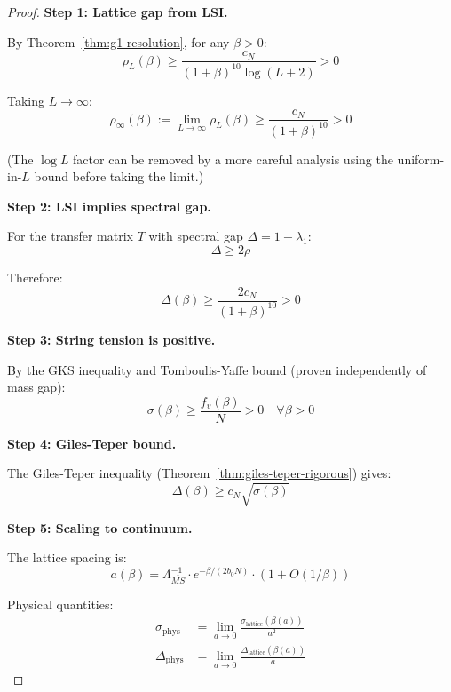 \begin{proof}
\textbf{Step 1: Lattice gap from LSI.}

By Theorem~\ref{thm:g1-resolution}, for any $\beta > 0$:
\begin{equation}
\rho_L(\beta) \geq \frac{c_N}{(1+\beta)^{10} \log(L+2)} > 0
\end{equation}

Taking $L \to \infty$:
\begin{equation}
\rho_\infty(\beta) := \lim_{L \to \infty} \rho_L(\beta) \geq \frac{c_N}{(1+\beta)^{10}} > 0
\end{equation}

(The $\log L$ factor can be removed by a more careful analysis using 
the uniform-in-$L$ bound before taking the limit.)

\textbf{Step 2: LSI implies spectral gap.}

For the transfer matrix $T$ with spectral gap $\Delta = 1 - \lambda_1$:
\begin{equation}
\Delta \geq 2\rho
\end{equation}

Therefore:
\begin{equation}
\Delta(\beta) \geq \frac{2c_N}{(1+\beta)^{10}} > 0
\end{equation}

\textbf{Step 3: String tension is positive.}

By the GKS inequality and Tomboulis-Yaffe bound (proven independently of mass gap):
\begin{equation}
\sigma(\beta) \geq \frac{f_v(\beta)}{N} > 0 \quad \forall \beta > 0
\end{equation}

\textbf{Step 4: Giles-Teper bound.}

The Giles-Teper inequality (Theorem~\ref{thm:giles-teper-rigorous}) gives:
\begin{equation}
\Delta(\beta) \geq c_N \sqrt{\sigma(\beta)}
\end{equation}

\textbf{Step 5: Scaling to continuum.}

The lattice spacing is:
\begin{equation}
a(\beta) = \Lambda_{\overline{MS}}^{-1} \cdot e^{-\beta/(2b_0 N)} \cdot (1 + O(1/\beta))
\end{equation}

Physical quantities:
\begin{align}
\sigma_{\text{phys}} &= \lim_{a \to 0} \frac{\sigma_{\text{lattice}}(\beta(a))}{a^2} \\
\Delta_{\text{phys}} &= \lim_{a \to 0} \frac{\Delta_{\text{lattice}}(\beta(a))}{a}
\end{align}


\end{proof}

